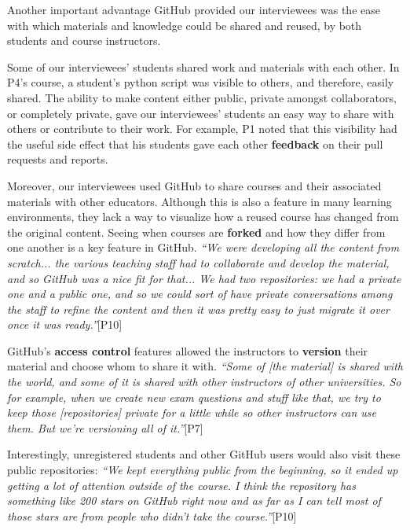 Another important advantage GitHub provided our interviewees was the ease with which materials and knowledge could be shared and reused, by both students and course instructors.

Some of our interviewees' students shared work and materials with each other. In P4's course, a student's python script was visible to others, and therefore, easily shared. The ability to make content either public, private amongst collaborators, or completely private, gave our interviewees' students an easy way to share with others or contribute to their work. For example, P1 noted that this visibility had the useful side effect that his students gave each other \textbf{feedback} on their pull requests and reports.

Moreover, our interviewees used GitHub to share courses and their associated materials with other educators. Although this is also a feature in many learning environments, they lack a way to visualize how a reused course has changed from the original content. Seeing when courses are \textbf{forked} and how they differ from one another is a key feature in GitHub.
\textit{``We were developing all the content from scratch... the various teaching staff had to collaborate and develop the material, and so GitHub was a nice fit for that... We had two repositories: we had a private one and a public one, and so we could sort of have private conversations among the staff to refine the content and then it was pretty easy to just migrate it over once it was ready.''}[P10]

GitHub's \textbf{access control} features allowed the instructors to \textbf{version} their material and choose whom to share it with. \textit{``Some of [the material] is shared with the world, and some of it is shared with other instructors of other universities. So for example, when we create new exam questions and stuff like that, we try to keep those [repositories] private for a little while so other instructors can use them. But we're versioning all of it.''}[P7]

Interestingly, unregistered students and other GitHub users would also visit these public repositories: \textit{``We kept everything public from the beginning, so it ended up getting a lot of attention outside of the course. I think the repository has something like 200 stars on GitHub right now and as far as I can tell most of those stars are from people who didn't take the course.''}[P10]

